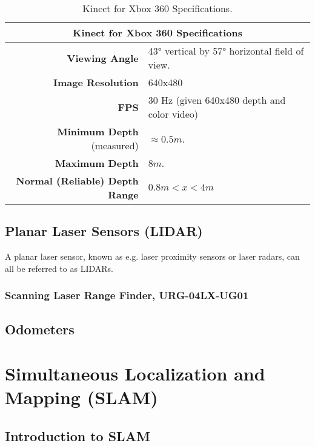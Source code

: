 \begin{table}
	\centering
	\begin{tabular}{ r | p{6.8cm} }
		\hline
		\multicolumn{2}{c}{Kinect for Xbox 360 Specifications}\\
		\hline
		\textbf{Viewing Angle} & 43° vertical by 57° horizontal field of view. \\
		\hline
		\textbf{Image Resolution} & 640x480 \\
		\hline
		\textbf{FPS} & 30 Hz (given 640x480 depth and color video)\\
		\hline
		\textbf{Minimum Depth} (measured) & $\approx 0.5m$.\\
		\hline
		\textbf{Maximum Depth} & $8 m$.\\
		\hline
		\textbf{Normal (Reliable) Depth Range} & $0.8m < x < 4m$\\
		\hline\hline
	\end{tabular}
	\caption{Kinect for Xbox 360 Specifications.}\label{tab:kinect}
\end{table}




\subsection{Planar Laser Sensors (LIDAR)}

A planar laser sensor, known as e.g. laser proximity sensors or laser radars, can all be referred to as LIDARs. 

\subsubsection{Scanning Laser Range Finder, URG-04LX-UG01}


\subsection{Odometers}


\section{Simultaneous Localization and Mapping (SLAM)}

\subsection{Introduction to SLAM}

